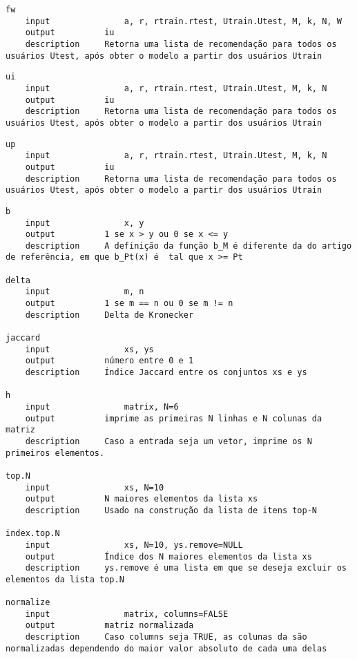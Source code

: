 \begin{lstlisting}[caption=\texttt{fw}.R]
fw
	input				a, r, rtrain.rtest, Utrain.Utest, M, k, N, W
	output			iu
	description		Retorna uma lista de recomendação para todos os usuários Utest, após obter o modelo a partir dos usuários Utrain
\end{lstlisting}

\begin{lstlisting}[caption=\texttt{ui}.R]
ui
	input				a, r, rtrain.rtest, Utrain.Utest, M, k, N
	output			iu
	description		Retorna uma lista de recomendação para todos os usuários Utest, após obter o modelo a partir dos usuários Utrain
\end{lstlisting}

\begin{lstlisting}[caption=\texttt{up}.R]
up
	input				a, r, rtrain.rtest, Utrain.Utest, M, k, N
	output			iu
	description		Retorna uma lista de recomendação para todos os usuários Utest, após obter o modelo a partir dos usuários Utrain
\end{lstlisting}



\begin{lstlisting}[caption=\texttt{functions}.R]
b
	input				x, y
	output			1 se x > y ou 0 se x <= y
	description		A definição da função b_M é diferente da do artigo de referência, em que b_Pt(x) é  tal que x >= Pt

delta
	input				m, n
	output			1 se m == n ou 0 se m != n
	description		Delta de Kronecker

jaccard
	input				xs, ys
	output			número entre 0 e 1
	description		Índice Jaccard entre os conjuntos xs e ys	

h
	input				matrix, N=6
	output			imprime as primeiras N linhas e N colunas da matriz
	description		Caso a entrada seja um vetor, imprime os N primeiros elementos. 

top.N
	input				xs, N=10
	output			N maiores elementos da lista xs
	description		Usado na construção da lista de itens top-N 

index.top.N
	input				xs, N=10, ys.remove=NULL
	output			Índice dos N maiores elementos da lista xs
	description		ys.remove é uma lista em que se deseja excluir os elementos da lista top.N

normalize
	input				matrix, columns=FALSE
	output			matriz normalizada
	description		Caso columns seja TRUE, as colunas da são normalizadas dependendo do maior valor absoluto de cada uma delas
\end{lstlisting}